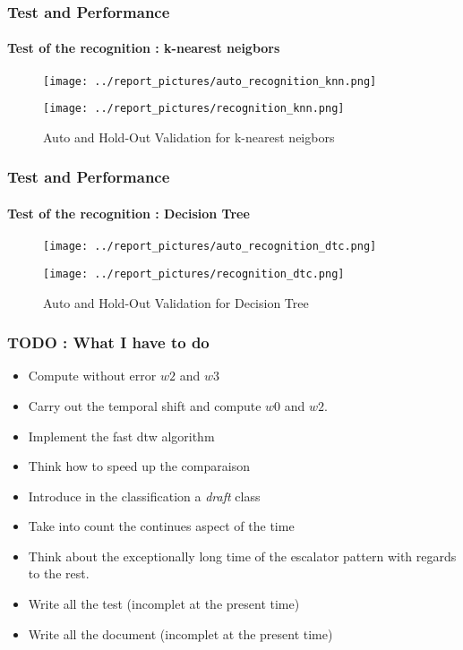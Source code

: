 \documentclass[11pt, sans, handout]{beamer}
\begin{document}
\begin{frame}
	\frametitle{Test and Performance}
	\framesubtitle{Test of the recognition : k-nearest neigbors}
			
	\begin{figure}[H]
			\begin{minipage}[c]{.46\linewidth}
      			\texttt{[image: ../report\_pictures/auto\_recognition\_knn.png]}
  			\end{minipage} \hfill
   			\begin{minipage}[c]{.46\linewidth}
      			\texttt{[image: ../report\_pictures/recognition\_knn.png]}
   			\end{minipage}
		\caption{Auto and Hold-Out Validation for k-nearest neigbors}
		\label{knn}
	\end{figure}
	
\end{frame}

\begin{frame}
	\frametitle{Test and Performance}
	\framesubtitle{Test of the recognition : Decision Tree}
			
	\begin{figure}[H]
			\begin{minipage}[c]{.46\linewidth}
      			\texttt{[image: ../report\_pictures/auto\_recognition\_dtc.png]}
  			\end{minipage} \hfill
   			\begin{minipage}[c]{.46\linewidth}
      			\texttt{[image: ../report\_pictures/recognition\_dtc.png]}
   			\end{minipage}
		\caption{Auto and Hold-Out Validation for Decision Tree}
		\label{dtc}
	\end{figure}
	
\end{frame}

\begin{frame}
	\frametitle{TODO : What I have to do}
	
	\begin{itemize}
	\item Compute without error $w2$ and $w3$
	\item Carry out the temporal shift and compute $w0$ and $w2$.
	\item Implement the fast dtw algorithm
	\item Think how to speed up the comparaison
	\item Introduce in the classification a \textit{draft} class
	\item Take into count the continues aspect of the time
	\item Think about the exceptionally long time of the escalator pattern with  regards to the rest.
	\item Write all the test (incomplet at the present time)
	\item Write all the document (incomplet at the present time)
	\end{itemize}
\end{frame}	

%        
%        
\end{document}
